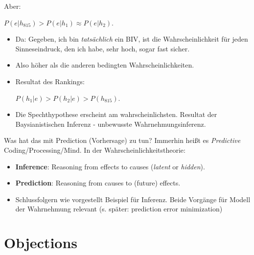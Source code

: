 \documentclass[11pt, handout]{beamer}
\begin{document}
\begin{frame}
  Aber:
  \begin{center}
    $P(e|h_{815}) > P(e|h_1) \approx P(e|h_2)$.
  \end{center}
  \begin{itemize}[<+->]
  \item Da: Gegeben, ich bin \emph{tatsächlich} ein BIV, ist die
    Wahrscheinlichkeit für jeden Sinneseindruck, den ich habe, sehr
    hoch, sogar fast sicher.
  \item Also höher als die anderen bedingten Wahrscheinlichkeiten.
  \item Resultat des Rankings:
    \begin{center}
      $P(h_1|e) > P(h_2|e) > P(h_{815})$.
    \end{center}
  \item Die Spechthypothese erscheint am wahrscheinlichsten. Resultat
    der Baysianistischen Inferenz - unbewusste Wahrnehmungsinferenz.
  \end{itemize}
\end{frame}


\begin{frame}
  Was hat das mit Prediction (Vorhersage) zu tun? Immerhin heißt es
  \emph{Predictive} Coding/Processing/Mind.  In der
  Wahrscheinlichkeitstheorie:
  \begin{itemize}[<+->]
  \item \textbf{Inference}: Reasoning from effects to causes
    (\emph{latent} or \emph{hidden}).
  \item \textbf{Prediction}: Reasoning from causes to (future)
    effects.
  \item Schlussfolgern wie vorgestellt Beispiel für Inferenz. Beide
    Vorgänge für Modell der Wahrnehmung relevant (s. später:
    prediction error minimization)
  \end{itemize}
\end{frame}



\section{Objections}
\end{document}
